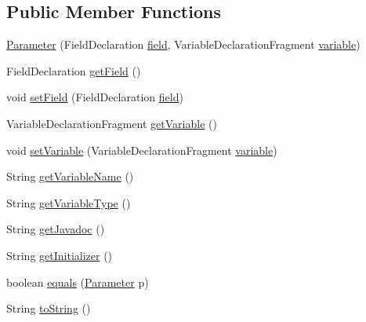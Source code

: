 \subsection*{Public Member Functions}
\begin{DoxyCompactItemize}
\item 
\hyperlink{classit_1_1isislab_1_1masonassisteddocumentation_1_1mason_1_1analizer_1_1_parameter_a4567bcea3ba15679d4affd796dff7eb1}{Parameter} (Field\-Declaration \hyperlink{classit_1_1isislab_1_1masonassisteddocumentation_1_1mason_1_1analizer_1_1_parameter_af1c679e712110eca7b088ce336208ca2}{field}, Variable\-Declaration\-Fragment \hyperlink{classit_1_1isislab_1_1masonassisteddocumentation_1_1mason_1_1analizer_1_1_parameter_a01644b9462f906462ae41ae5dd61cf3f}{variable})
\item 
Field\-Declaration \hyperlink{classit_1_1isislab_1_1masonassisteddocumentation_1_1mason_1_1analizer_1_1_parameter_a4f20f1fbac19c16ea44ffe7581b69658}{get\-Field} ()
\item 
void \hyperlink{classit_1_1isislab_1_1masonassisteddocumentation_1_1mason_1_1analizer_1_1_parameter_accf9ba909edb70578efeccac0c6c320a}{set\-Field} (Field\-Declaration \hyperlink{classit_1_1isislab_1_1masonassisteddocumentation_1_1mason_1_1analizer_1_1_parameter_af1c679e712110eca7b088ce336208ca2}{field})
\item 
Variable\-Declaration\-Fragment \hyperlink{classit_1_1isislab_1_1masonassisteddocumentation_1_1mason_1_1analizer_1_1_parameter_a5145b6cfff0d782fb6fc7a09ace99e5f}{get\-Variable} ()
\item 
void \hyperlink{classit_1_1isislab_1_1masonassisteddocumentation_1_1mason_1_1analizer_1_1_parameter_a9df3dfb60e5e76939b9c3317617c5fe1}{set\-Variable} (Variable\-Declaration\-Fragment \hyperlink{classit_1_1isislab_1_1masonassisteddocumentation_1_1mason_1_1analizer_1_1_parameter_a01644b9462f906462ae41ae5dd61cf3f}{variable})
\item 
String \hyperlink{classit_1_1isislab_1_1masonassisteddocumentation_1_1mason_1_1analizer_1_1_parameter_aeb5c13b8a5bb75063046297b440da70b}{get\-Variable\-Name} ()
\item 
String \hyperlink{classit_1_1isislab_1_1masonassisteddocumentation_1_1mason_1_1analizer_1_1_parameter_acf019918eb995d5689c232497aa3c0cb}{get\-Variable\-Type} ()
\item 
String \hyperlink{classit_1_1isislab_1_1masonassisteddocumentation_1_1mason_1_1analizer_1_1_parameter_ae3c5fe36e4dabf92299cb22f74b7004e}{get\-Javadoc} ()
\item 
String \hyperlink{classit_1_1isislab_1_1masonassisteddocumentation_1_1mason_1_1analizer_1_1_parameter_a387b739b0df5093a640fbc9303f8f494}{get\-Initializer} ()
\item 
boolean \hyperlink{classit_1_1isislab_1_1masonassisteddocumentation_1_1mason_1_1analizer_1_1_parameter_a944f812895adbc9da364eedd5b8fae2a}{equals} (\hyperlink{classit_1_1isislab_1_1masonassisteddocumentation_1_1mason_1_1analizer_1_1_parameter}{Parameter} p)
\item 
String \hyperlink{classit_1_1isislab_1_1masonassisteddocumentation_1_1mason_1_1analizer_1_1_parameter_a35e65b1fda861615ad93b81d814dda05}{to\-String} ()
\end{DoxyCompactItemize}
